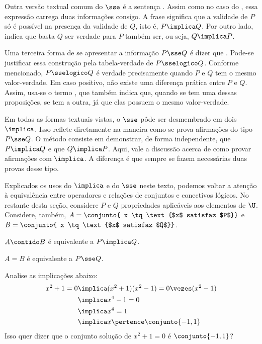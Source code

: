 Outra versão textual comum do $\sse$ é a sentença . Assim como no caso do , essa expressão carrega duas informações consigo. A frase  significa que a validade de $P$ só é possível na presença da validade de $Q$, isto é, $P \implica Q$. Por outro lado,  indica que basta $Q$ ser verdade para $P$ também ser, ou seja, $Q \implica P$.

Uma terceira forma de se apresentar a informação $P \sse Q$ é dizer que . Pode-se justificar essa construção pela tabela-verdade de $P \sselogico Q$. Conforme mencionado, $P \sselogico Q$ é verdade precisamente quando $P$ e $Q$ tem o mesmo valor-verdade. Em caso positivo, não existe uma diferença prática entre $P$ e $Q$. Assim, usa-se o termo , que também indica que, quando se tem uma dessas proposições, se tem a outra, já que elas possuem o mesmo valor-verdade.

Em todas as formas textuais vistas, o $\sse$ pôde ser desmembrado em dois $\implica$. Isso reflete diretamente na maneira como se prova afirmações do tipo $P \sse Q$. O método consiste em demonstrar, de forma independente, que $P \implica Q$ e que $Q \implica P$. Aqui, vale a discussão acerca de como provar afirmações com $\implica$. A diferença é que sempre se fazem necessárias duas provas desse tipo.

Explicados os usos do $\implica$  e do $\sse$ neste texto, podemos voltar a atenção à equivalência entre operadores e relações de conjuntos e conectivos lógicos. No restante desta seção, considere $P$ e $Q$ propriedades aplicáveis aos elementos de $\U$. Considere, também, $A = \conjunto{ x \tq \text{$x$ satisfaz $P$}}$ e $B = \conjunto{ x \tq \text{$x$ satisfaz $Q$}}$.

\begin{proposition} 
	$A \contido B$ é equivalente a $P \implica Q$.
\end{proposition}

\begin{proposition} 
	$A = B$ é equivalente a $P \sse Q$.
\end{proposition}

\begin{example}
	Analise as implicações abaixo:
	\begin{align*}
        x^2+1=0 &\implica (x^2+1)(x^2-1) = 0 \vezes (x^2-1) \\
                &\implica x^4 - 1 = 0 \\
                &\implica x^4 = 1 \\
                &\implica x \pertence \conjunto {-1, 1}
	\end{align*}
	Isso quer dizer que o conjunto solução de $x^2 +1 = 0$ é $\conjunto{-1, 1}$?
\end{example}

